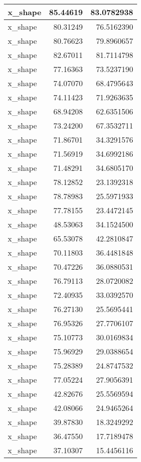 \documentclass[
]{book}
\theoremstyle{definition}
\theoremstyle{definition}
\theoremstyle{definition}
\theoremstyle{definition}
\theoremstyle{remark}
\begin{document}
\begin{tabular}{l|r|r}
\hline
x\_shape & 85.44619 & 83.0782938\\
\hline
x\_shape & 80.31249 & 76.5162390\\
\hline
x\_shape & 80.76623 & 79.8960657\\
\hline
x\_shape & 82.67011 & 81.7114798\\
\hline
x\_shape & 77.16363 & 73.5237190\\
\hline
x\_shape & 74.07070 & 68.4795643\\
\hline
x\_shape & 74.11423 & 71.9263635\\
\hline
x\_shape & 68.94208 & 62.6351506\\
\hline
x\_shape & 73.24200 & 67.3532711\\
\hline
x\_shape & 71.86701 & 34.3291576\\
\hline
x\_shape & 71.56919 & 34.6992186\\
\hline
x\_shape & 71.48291 & 34.6805170\\
\hline
x\_shape & 78.12852 & 23.1392318\\
\hline
x\_shape & 78.78983 & 25.5971933\\
\hline
x\_shape & 77.78155 & 23.4472145\\
\hline
x\_shape & 48.53063 & 34.1524500\\
\hline
x\_shape & 65.53078 & 42.2810847\\
\hline
x\_shape & 70.11803 & 36.4481848\\
\hline
x\_shape & 70.47226 & 36.0880531\\
\hline
x\_shape & 76.79113 & 28.0720082\\
\hline
x\_shape & 72.40935 & 33.0392570\\
\hline
x\_shape & 76.27130 & 25.5695441\\
\hline
x\_shape & 76.95326 & 27.7706107\\
\hline
x\_shape & 75.10773 & 30.0169834\\
\hline
x\_shape & 75.96929 & 29.0388654\\
\hline
x\_shape & 75.28389 & 24.8747532\\
\hline
x\_shape & 77.05224 & 27.9056391\\
\hline
x\_shape & 42.82676 & 25.5569594\\
\hline
x\_shape & 42.08066 & 24.9465264\\
\hline
x\_shape & 39.87830 & 18.3249292\\
\hline
x\_shape & 36.47550 & 17.7189478\\
\hline
x\_shape & 37.10307 & 15.4456116\\

\end{tabular}
\end{document}
